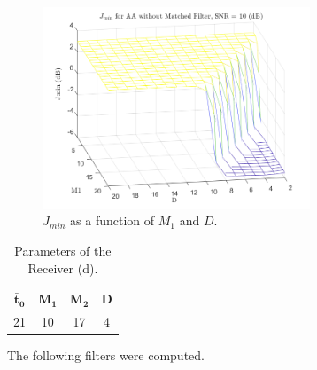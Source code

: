 \documentclass[a4paper, 12pt]{report}
\begin{document}
\begin{figure}[H]
	\centering
	\includegraphics[width=8cm]{images/optimal_params_AntiAliasingNoMF}
	\caption{$J_{min}$ as a function of $M_1$ and $D$.}\label{j_min_aa_nomf}
\end{figure}

\begin{table}[H]
	\centering
	\begin{tabular}{c c c c}
		\toprule
		$\mathbf{\bar{t}_0}$ & $\mathbf{M_1}$ & $\mathbf{M_2}$ & \textbf{D}     \\
		\midrule
		21 & 10 & 17 & 4 \\
		\bottomrule			
	\end{tabular}
	\caption{Parameters of the Receiver (d).}
	\label{Tab_d}
\end{table}

The following filters were computed.
\end{document}
